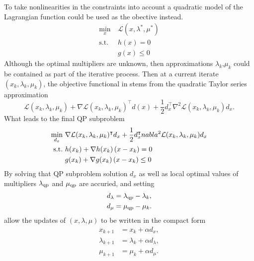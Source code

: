 To take nonlinearities in the constraints into account a quadratic model of the Lagrangian function could be used as the obective instead.
\begin{subequations}
	\begin{align}
	\min_{x}\  & \mathcal{L}(x,\lambda^*,\mu^*)\\
	\text{s.t.}\  &h(x)= 0\\
	&g(x)\leq 0
	\end{align}
\end{subequations}
Although the optimal multipliers are unknown, then approximations $\lambda_k$,$\mu_k$ could be contained as part of the iterative process. Then at a current iterate $(x_k,\lambda_k,\mu_k)$, the objective functional in stems from the quadratic Taylor series approximation
\begin{equation}
	\mathcal{L}(x_k,\lambda_k,\mu_k)+\nabla\mathcal{L}(x_k,\lambda_k,\mu_k)^\intercal d(x)+\frac{1}{2}d_x^\intercal \nabla^2\mathcal{L}(x_k,\lambda_k,\mu_k)d_x.
\end{equation}
What leads to the final QP subproblem
\begin{subequations}
	\begin{align}
	\min_{d_x}\  &\nabla \mathcal{L}(x_k,\lambda_k,\mu_k)^\intercal d_x+\frac{1}{2}d_x^\intercal nabla^2\mathcal{L}(x_k,\lambda_k,\mu_k)d_x\\
	\text{s.t.}\  &h(x_k)+\nabla h(x_k)\left( x-x_k \right) = 0\\
	&g(x_k)+\nabla g(x_k)\left( x-x_k \right)\leq 0
	\end{align}
\end{subequations}
By solving that QP subproblem solution $d_x$ as well as local optimal values of multipliers $\lambda _{\text{qp}}$ and $\mu _{\text{qp}}$ are accuried, and setting 
\begin{subequations}
	\begin{align}
		d_\lambda &= \lambda _{\text{qp}}-\lambda_k,\\
		d_\mu &= \mu _{\text{qp}}-\mu_k.
	\end{align}
\end{subequations}
allow the updates of $(x,\lambda,\mu)$ to be written in the compact form
\begin{subequations}
	\begin{align}
	x_{k+1} &= x_k + \alpha d_x,\\
	\lambda_{k+1} &= \lambda_k + \alpha d_\lambda,\\
	\mu_{k+1} &= \mu_k + \alpha d_\mu.
	\end{align}
\end{subequations}
